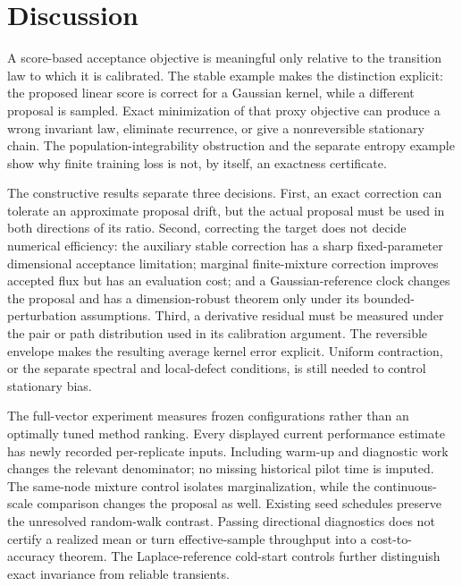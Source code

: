 \documentclass[pdflatex,iicol,sn-mathphys-ay]{sn-jnl}
\theoremstyle{definition}\newtheorem{definition}[theorem]{Definition}
\theoremstyle{remark}\newtheorem{remark}[theorem]{Remark}
\numberwithin{equation}{section}
\newcommand{\1}{\mathbf 1}
\begin{document}
\FloatBarrier
\section{Discussion}\label{sec:discussion}
A score-based acceptance objective is meaningful only relative to the transition law to which it is calibrated. The stable example makes the distinction explicit: the proposed linear score is correct for a Gaussian kernel, while a different proposal is sampled. Exact minimization of that proxy objective can produce a wrong invariant law, eliminate recurrence, or give a nonreversible stationary chain. The population-integrability obstruction and the separate entropy example show why finite training loss is not, by itself, an exactness certificate.

The constructive results separate three decisions. First, an exact correction can tolerate an approximate proposal drift, but the actual proposal must be used in both directions of its ratio. Second, correcting the target does not decide numerical efficiency: the auxiliary stable correction has a sharp fixed-parameter dimensional acceptance limitation; marginal finite-mixture correction improves accepted flux but has an evaluation cost; and a Gaussian-reference clock changes the proposal and has a dimension-robust theorem only under its bounded-perturbation assumptions. Third, a derivative residual must be measured under the pair or path distribution used in its calibration argument. The reversible envelope makes the resulting average kernel error explicit. Uniform contraction, or the separate spectral and local-defect conditions, is still needed to control stationary bias.

The full-vector experiment measures frozen configurations rather than an optimally tuned method ranking. Every displayed current performance estimate has newly recorded per-replicate inputs. Including warm-up and diagnostic work changes the relevant denominator; no missing historical pilot time is imputed. The same-node mixture control isolates marginalization, while the continuous-scale comparison changes the proposal as well. Existing seed schedules preserve the unresolved random-walk contrast. Passing directional diagnostics does not certify a realized mean or turn effective-sample throughput into a cost-to-accuracy theorem. The Laplace-reference cold-start controls further distinguish exact invariance from reliable transients.
\end{document}

